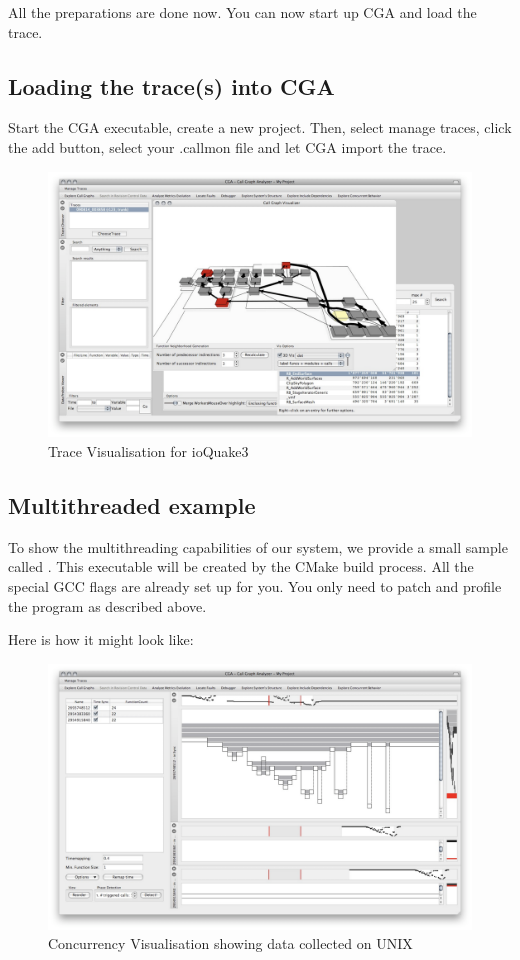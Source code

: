 All the preparations are done now. You can now start up CGA and load the trace.

\subsection{Loading the trace(s) into CGA} Start the CGA executable, create a new project. Then, select manage traces, click the add button, select your .callmon file and let CGA import the trace.

\begin{figure}[ht]
\centering
\includegraphics[width=16cm]{images/ioquake3_trace}
\caption{Trace Visualisation for ioQuake3}\label{fig:ioquake3_trace}
\end{figure}

\subsection{Multithreaded example} To show the multithreading capabilities of our system, we provide a small sample called . This executable will be created by the CMake build process. All the special GCC flags are already set up for you. You only need to patch and profile the program as described above.

Here is how it might look like:

\begin{figure}[ht]
\centering
\includegraphics[width=16cm]{images/cga_threads}
\caption{Concurrency Visualisation showing data collected on UNIX}\label{fig:cga_threads}
\end{figure}

